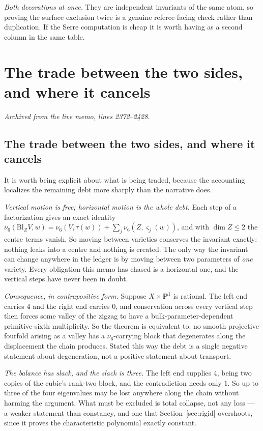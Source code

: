 \documentclass[11pt]{article}
\theoremstyle{definition}
\theoremstyle{remark}
\newcommand{\PP}{\mathbf P}
\begin{document}
\emph{Both decorations at once.} They are independent invariants of the same
atom, so proving the surface exclusion twice is a genuine referee-facing check
rather than duplication. If the Serre computation is cheap it is worth having as
a second column in the same table.


\section{The trade between the two sides, and where it cancels}
\noindent\emph{Archived from the live memo, lines 2372--2428.}

\subsection*{The trade between the two sides, and where it cancels}


It is worth being explicit about what is being traded, because the accounting
localizes the remaining debt more sharply than the narrative does.

\emph{Vertical motion is free; horizontal motion is the whole debt.} Each step of
a factorization gives an exact identity
$\nu_6(\mathrm{Bl}_ZV,w)=\nu_6(V,\tau(w))+\sum_j\nu_6(Z,\varsigma_j(w))$, and with
$\dim Z\le2$ the centre terms vanish. So moving between varieties conserves the
invariant exactly: nothing leaks into a centre and nothing is created. The only
way the invariant can change anywhere in the ledger is by moving between two
parameters of \emph{one} variety. Every obligation this memo has chased is a
horizontal one, and the vertical steps have never been in doubt.

\emph{Consequence, in contrapositive form.} Suppose $X\times\PP^1$ is rational.
The left end carries $4$ and the right end carries $0$, and conservation across
every vertical step then forces some valley of the zigzag to have a
bulk-parameter-dependent primitive-sixth multiplicity. So the theorem is
equivalent to: no smooth projective fourfold arising as a valley has a
$\nu_6$-carrying block that degenerates along the displacement the chain
produces. Stated this way the debt is a single negative statement about
degeneration, not a positive statement about transport.

\emph{The balance has slack, and the slack is three.} The left end supplies $4$,
being two copies of the cubic's rank-two block, and the contradiction needs only
$1$. So up to three of the four eigenvalues may be lost anywhere along the chain
without harming the argument. What must be excluded is total collapse, not any
loss --- a weaker statement than constancy, and one that Section~\textup{[sec:rigid]}
overshoots, since it proves the characteristic polynomial exactly constant.
\end{document}
